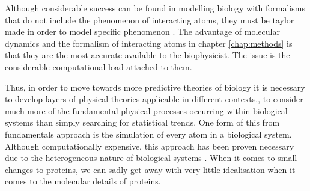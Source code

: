 Although considerable success can be found in modelling biology with formalisms that do not include the phenomenon of interacting atoms, they must be taylor made in order to model specific phenomenon \cite{phillips2012}. The advantage of molecular dynamics and the formalism of interacting atoms in chapter \ref{chap:methods} is that they are the most accurate available to the biophysicist. The issue is the considerable computational load attached to them. 

Thus, in order to move towards more predictive theories of biology it is necessary to develop layers of physical theories applicable in different contexts., to consider much more of the fundamental physical processes occurring within biological systems than simply searching for statistical trends. One form of this from fundamentals approach is the simulation of every atom in a biological system. Although computationally expensive, this approach has been proven necessary due to the heterogeneous nature of biological systems \cite{moy2000, corry2000a}. When it comes to small changes to proteins, we can sadly get away with very little idealisation when it comes to the molecular details of proteins.








